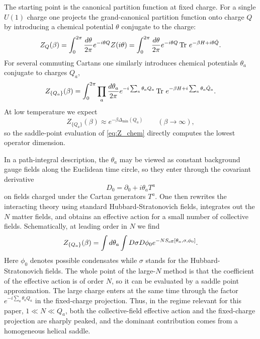\documentclass[a4paper,11pt]{article}
\newcommand\Dm{\Delta_{\min}}
\begin{document}
The starting point is the canonical partition function at fixed charge. For a single $U(1)$ charge one projects the grand-canonical partition function onto charge $Q$ by introducing a chemical potential $\theta$ conjugate to the charge:
\begin{equation}
    Z_Q(\beta) =
    \int_0^{2\pi}\frac{d\theta}{2\pi}
    e^{-i\theta Q}
    Z(i\theta)
    = \int_0^{2\pi}\frac{d\theta}{2\pi}
    e^{-i\theta Q}
    \Tr\,e^{-\beta H+i\theta \hat Q}.
\end{equation}
For several commuting Cartans one similarly introduces chemical potentials $\theta_a$ conjugate to charges $Q_a$,
\begin{equation}\label{eq:Z_chem}
  Z_{\{Q_a\}}(\beta) = \int_0^{2\pi}\prod_a\frac{d\theta_a}{2\pi} e^{-i\sum_a\theta_aQ_a} \Tr\,e^{-\beta H+i\sum_a\theta_a\hat Q_a}.
\end{equation}
At low temperature we expect
\begin{equation}
  Z_{\{Q_a\}}(\beta) \approx e^{-\beta\Dm(Q_a)} \qquad (\beta\to\infty),
\end{equation}
so the saddle-point evaluation of \eqref{eq:Z_chem} directly computes the lowest operator dimension.

In a path-integral description, the $\theta_a$ may be viewed as constant background gauge fields along the Euclidean time circle, so they enter through the covariant derivative
\begin{equation}
  D_0 = \partial_0+i\theta_aT^a
\end{equation}
on fields charged under the Cartan generators $T^a$. One then rewrites the interacting theory using standard Hubbard-Stratonovich fields, integrates out the $N$ matter fields, and obtains an effective action for a small number of collective fields. Schematically, at leading order in $N$ we find
\begin{equation}
  Z_{\{Q_a\}}(\beta) = \int d\theta_a\int D\sigma D\phi_0 e^{-N S_{\rm eff}[\theta_a,\sigma,\phi_0]}.
\end{equation}
Here $\phi_0$ denotes possible condensates while $\sigma$ stands for the Hubbard-Stratonovich fields. The whole point of the large-$N$ method is that the coefficient of the effective action is of order $N$, so it can be evaluated by a saddle point approximation. The large charge enters at the same time through the factor $e^{-i\sum_a\theta_aQ_a}$ in the fixed-charge projection. Thus, in the regime relevant for this paper, $1\ll N\ll Q_a$, both the collective-field effective action and the fixed-charge projection are sharply peaked, and the dominant contribution comes from a homogeneous helical saddle.
\end{document}
